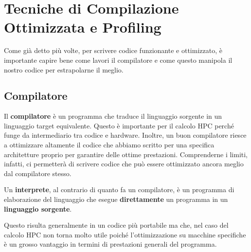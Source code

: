 \chapter{Tecniche di Compilazione Ottimizzata e Profiling}
Come già detto più volte, per scrivere codice funzionante e ottimizzato, è importante capire bene come lavori il compilatore e come questo manipola il nostro codice per estrapolarne il meglio.

\section{Compilatore}
Il \textbf{compilatore} è un programma che traduce il linguaggio sorgente in un linguaggio target equivalente.
Questo è importante per il calcolo HPC perché funge da intermediario tra codice e hardware. Inoltre, un buon compilatore riesce a ottimizzare altamente il codice che abbiamo scritto per una specifica architetture proprio per garantire delle ottime prestazioni. 
Comprenderne i limiti, infatti, ci permetterà di scrivere codice che può essere ottimizzato ancora meglio dal compilatore stesso.

Un \textbf{interprete}, al contrario di quanto fa un compilatore, è un programma di elaborazione del linguaggio che esegue \textbf{direttamente} un programma in un \textbf{linguaggio sorgente}.

Questo risulta generalmente in un codice più portabile ma che, nel caso del calcolo HPC non torna molto utile poiché l'ottimizzazione su macchine specifiche è un grosso vantaggio in termini di prestazioni generali del programma.


